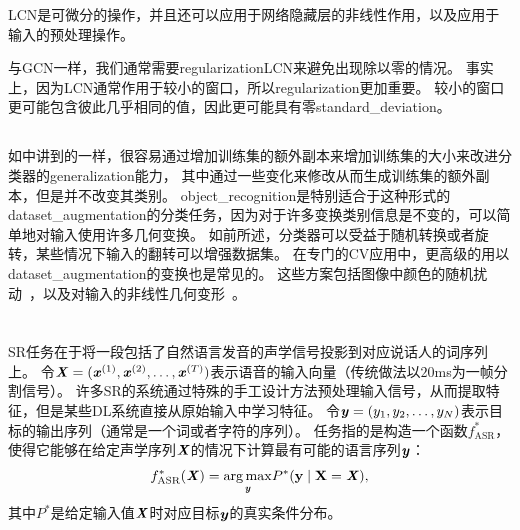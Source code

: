 \gls{LCN}是可微分的操作，并且还可以应用于网络隐藏层的非线性作用，以及应用于输入的预处理操作。

与\gls{GCN}一样，我们通常需要\gls{regularization}\gls{LCN}来避免出现除以零的情况。
事实上，因为\gls{LCN}通常作用于较小的窗口，所以\gls{regularization}更加重要。
较小的窗口更可能包含彼此几乎相同的值，因此更可能具有零\gls{standard_deviation}。


\subsection{}
\label{sec:dataset_augmentation_chap12}
如中讲到的一样，很容易通过增加训练集的额外副本来增加训练集的大小来改进分类器的\gls{generalization}能力，
其中通过一些变化来修改从而生成训练集的额外副本，但是并不改变其类别。
\gls{object_recognition}是特别适合于这种形式的\gls{dataset_augmentation}的分类任务，因为对于许多变换类别信息是不变的，可以简单地对输入使用许多几何变换。
如前所述，分类器可以受益于随机转换或者旋转，某些情况下输入的翻转可以增强数据集。
在专门的\gls{CV}应用中，更高级的用以\gls{dataset_augmentation}的变换也是常见的。
这些方案包括图像中颜色的随机扰动~\citep{Krizhevsky-2012}，以及对输入的非线性几何变形~\citep{chapter-gradient-document-2001}。




\section{}
\label{sec:speech_recognition}

\gls{SR}任务在于将一段包括了自然语言发音的声学信号投影到对应说话人的词序列上。
令$\boldsymbol{\mathit{X}}=(\boldsymbol{\mathit{x}}^{(1)},\boldsymbol{\mathit{x}}^{(2)},\ldots,\boldsymbol{\mathit{x}}^{(T)})$表示语音的输入向量（传统做法以$20$ms为一帧分割信号）。
许多\gls{SR}的系统通过特殊的手工设计方法预处理输入信号，从而提取特征，但是某些\gls{DL}系统\citep{jaitly2011learning}直接从原始输入中学习特征。
令$\boldsymbol{\mathit{y}}=(y_{1},y_{2},\ldots,y_{N})$表示目标的输出序列（通常是一个词或者字符的序列）。
任务指的是构造一个函数$f^*_{\text{ASR}}$，使得它能够在给定声学序列$\boldsymbol{\mathit{X}}$的情况下计算最有可能的语言序列$\boldsymbol{\mathit{y}}$：
\begin{align}
\label{eqn:124}
f^*_{\text{ASR}}(\boldsymbol{\mathit{X}}) =  \underset{\boldsymbol{\mathit{y}}}{\arg\max}  P^*(\mathbf{y} \mid \boldsymbol{\mathrm{X}} = \boldsymbol{\mathit{X}}),
\end{align}
其中$P^*$是给定输入值$\boldsymbol{\mathit{X}}$时对应目标$\boldsymbol{\mathit{y}}$的真实条件分布。

